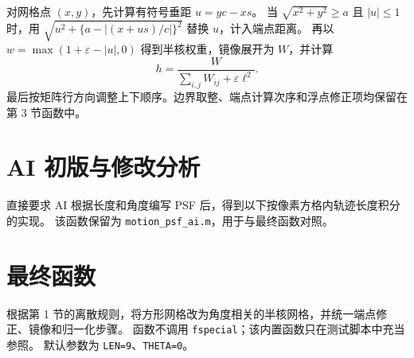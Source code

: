 \documentclass[UTF8,12pt,a4paper]{ctexart}
\begin{document}
对网格点 $(x,y)$，先计算有符号垂距 $u=yc-xs$。
当 $\sqrt{x^2+y^2}\ge a$ 且 $|u|\le1$ 时，用
$\sqrt{u^2+\{a-|(x+us)/c|\}^2}$ 替换 $u$，计入端点距离。
再以 $w=\max(1+\varepsilon-|u|,0)$ 得到半核权重，镜像展开为 $W$，并计算
\begin{equation}
 h=\frac{W}{\sum_{i,j}W_{ij}+\varepsilon\ell^2}.
\end{equation}
最后按矩阵行方向调整上下顺序。边界取整、端点计算次序和浮点修正项均保留在第 3 节函数中。

\clearpage
\section{AI 初版与修改分析}
直接要求 AI 根据长度和角度编写 PSF 后，得到以下按像素方格内轨迹长度积分的实现。
该函数保留为 \texttt{motion\_psf\_ai.m}，用于与最终函数对照。




\clearpage
\section{最终函数}
根据第 1 节的离散规则，将方形网格改为角度相关的半核网格，并统一端点修正、镜像和归一化步骤。
函数不调用 \texttt{fspecial}；该内置函数只在测试脚本中充当参照。
默认参数为 \texttt{LEN=9}、\texttt{THETA=0}。


\clearpage
\end{document}
